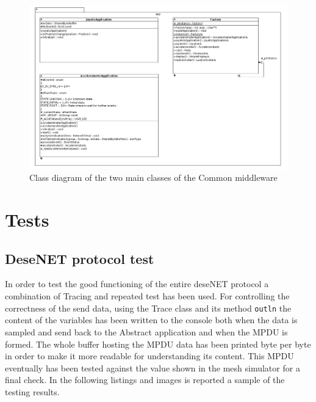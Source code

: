 \begin{figure}[H]
	\centering
	\includegraphics[width=\linewidth]{images/sensors_app.png}
	\caption{Class diagram of the two main classes of the Common middleware}
	\label{fig:common_middleware}
\end{figure}



\section{Tests}

\subsection{DeseNET protocol test}
In order to test the good functioning of the entire deseNET protocol a combination of Tracing and repeated test has been used. For controlling the correctness of the send data, using the Trace class and its method \texttt{outln} the content of the variables has been written to the console both when the data is sampled and send back to the Abstract application and  when the MPDU is formed. The whole buffer hosting the MPDU data has been printed byte per byte in order to make it more readable for understanding its content. This MPDU eventually has been tested against the value shown in the mesh simulator for a final check. In the following listings and images is reported a sample of the testing results.

